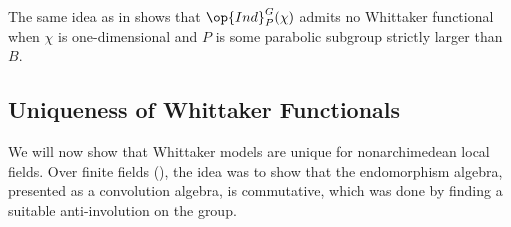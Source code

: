 \documentclass[../notes.tex]{subfiles}
\begin{document}
\begin{remark}
	The same idea as in  shows that $\op{Ind}_P^G(\chi)$ admits no Whittaker functional when $\chi$ is one-dimensional and $P$ is some parabolic subgroup strictly larger than $B$.
\end{remark}

\subsection{Uniqueness of Whittaker Functionals}
We will now show that Whittaker models are unique for nonarchimedean local fields. Over finite fields (), the idea was to show that the endomorphism algebra, presented as a convolution algebra, is commutative, which was done by finding a suitable anti-involution on the group.
\end{document}
